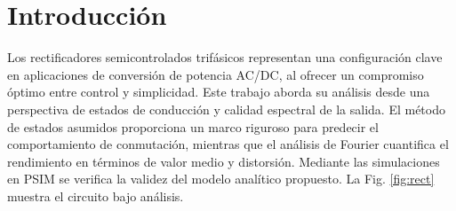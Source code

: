 \documentclass[conference]{IEEEtran}
\begin{document}
\IEEEpeerreviewmaketitle



\section{Introducción}
Los rectificadores semicontrolados trifásicos representan una configuración clave en aplicaciones de conversión de potencia AC/DC, al ofrecer un compromiso óptimo entre control y simplicidad.
Este trabajo aborda su análisis desde una perspectiva de estados de conducción y calidad espectral de la salida. El método de estados asumidos proporciona un marco riguroso para predecir el
comportamiento de conmutación, mientras que el análisis de Fourier cuantifica el rendimiento en términos de valor medio y distorsión. Mediante las simulaciones en PSIM se verifica la validez
del modelo analítico propuesto. La Fig. \ref{fig:rect} muestra el circuito bajo análisis.
\end{document}

